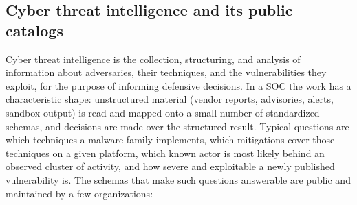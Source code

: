 \documentclass[a4paper,fleqn]{cas-dc}
\begin{document}
\subsection{Cyber threat intelligence and its public catalogs}\label{sec:bg-cti}
Cyber threat intelligence is the collection, structuring, and analysis of information about adversaries, their techniques, and the vulnerabilities they exploit, for the purpose of informing defensive decisions. In a SOC the work has a characteristic shape: unstructured material (vendor reports, advisories, alerts, sandbox output) is read and mapped onto a small number of standardized schemas, and decisions are made over the structured result. Typical questions are which techniques a malware family implements, which mitigations cover those techniques on a given platform, which known actor is most likely behind an observed cluster of activity, and how severe and exploitable a newly published vulnerability is. The schemas that make such questions answerable are public and maintained by a few organizations:
\end{document}
